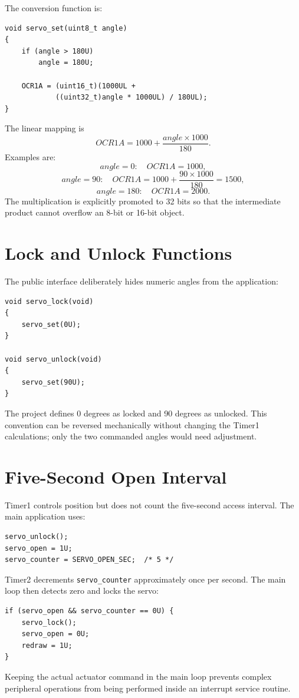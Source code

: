 \documentclass[11pt,a4paper]{article}
\begin{document}
The conversion function is:
\begin{lstlisting}[style=cstyle,caption={Angle-to-pulse conversion.}]
void servo_set(uint8_t angle)
{
    if (angle > 180U)
        angle = 180U;

    OCR1A = (uint16_t)(1000UL +
            ((uint32_t)angle * 1000UL) / 180UL);
}
\end{lstlisting}

The linear mapping is
\[
OCR1A=1000+\frac{angle\times1000}{180}.
\]
Examples are:
\[
angle=0:\quad OCR1A=1000,
\]
\[
angle=90:\quad OCR1A=1000+\frac{90\times1000}{180}=1500,
\]
\[
angle=180:\quad OCR1A=2000.
\]
The multiplication is explicitly promoted to 32 bits so that the intermediate product cannot overflow an 8-bit or 16-bit object.

\section{Lock and Unlock Functions}
The public interface deliberately hides numeric angles from the application:
\begin{lstlisting}[style=cstyle]
void servo_lock(void)
{
    servo_set(0U);
}

void servo_unlock(void)
{
    servo_set(90U);
}
\end{lstlisting}
The project defines 0 degrees as locked and 90 degrees as unlocked. This convention can be reversed mechanically without changing the Timer1 calculations; only the two commanded angles would need adjustment.

\section{Five-Second Open Interval}
Timer1 controls position but does not count the five-second access interval. The main application uses:
\begin{lstlisting}[style=cstyle]
servo_unlock();
servo_open = 1U;
servo_counter = SERVO_OPEN_SEC;  /* 5 */
\end{lstlisting}
Timer2 decrements \texttt{servo\_counter} approximately once per second. The main loop then detects zero and locks the servo:
\begin{lstlisting}[style=cstyle]
if (servo_open && servo_counter == 0U) {
    servo_lock();
    servo_open = 0U;
    redraw = 1U;
}
\end{lstlisting}
Keeping the actual actuator command in the main loop prevents complex peripheral operations from being performed inside an interrupt service routine.
\end{document}
